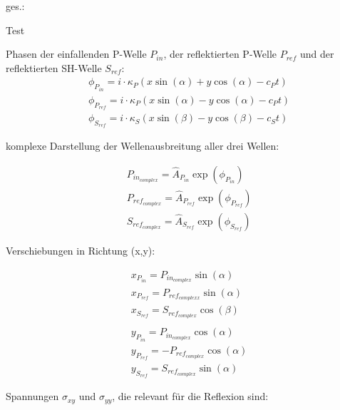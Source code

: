 \begin{minipage}[t]{\linewidth}
    ges.:
    \begin{tasks}
        \task[] Test
    \end{tasks}
\end{minipage}

\begin{solution}
    Phasen der einfallenden P-Welle $P_{in}$, der reflektierten P-Welle $P_{ref}$ und der reflektierten SH-Welle $S_{ref}$:
    \begin{align*}
            &\phi_{P_{in}} = \textit{i} \cdot \kappa_P (x \sin(\alpha) + y \cos(\alpha) - c_P t) \\
            &\phi_{P_{ref}} = \textit{i} \cdot \kappa_P (x \sin(\alpha) - y \cos(\alpha) - c_P t) \\
            &\phi_{S_{ref}} = \textit{i} \cdot \kappa_S (x \sin(\beta) - y \cos(\beta) - c_S t)
    \end{align*}

    komplexe Darstellung der Wellenausbreitung aller drei Wellen:

    \begin{align*}
        &P_{in_{complex}} = \hat{A}_{P_{in}} \exp(\phi_{P_{in}}) \\
        &P_{ref_{complex}} = \hat{A}_{P_{ref}} \exp(\phi_{P_{ref}}) \\
        &S_{ref_{complex}} = \hat{A}_{S_{ref}} \exp(\phi_{S_{ref}})
    \end{align*}

    Verschiebungen in Richtung (x,y):

    \begin{align*}
        &x_{P_{in}} = P_{in_{complex}} \sin(\alpha) \\
        &x_{P_{ref}} = P_{ref_{complexx}} \sin(\alpha) \\
        &x_{S_{ref}} = S_{ref_{complex}} \cos(\beta) \\
        \\
        &y_{P_{in}} = P_{in_{complex}} \cos(\alpha) \\
        &y_{P_{ref}} = - P_{ref_{complex}} \cos(\alpha) \\
        &y_{S_{ref}} = S_{ref_{complex}} \sin(\alpha)
    \end{align*}

    Spannungen $ \sigma_{xy}$ und $\sigma_{yy}$, die relevant für die Reflexion sind:


\end{solution}

